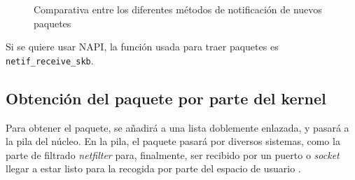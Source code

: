 \begin{figure}[hbtp]
\centering
{}%
\hspace{0.2\textwidth}
%
%
\caption{Comparativa entre los diferentes métodos de notificación de nuevos paquetes}
\end{figure}
%

Si se quiere usar NAPI, la función usada para traer paquetes es \texttt{netif\_receive\_skb}.

\subsection{Obtención del paquete por parte del kernel}
Para obtener el paquete, se añadirá a una lista doblemente enlazada, y pasará a la pila del núcleo. En la pila, el 
paquete pasará por diversos sistemas, como la parte de filtrado \emph{\gls{netfilter}} para, 
finalmente, ser recibido por un puerto o \emph{\gls{socket}} llegar a estar listo para la recogida por parte del espacio 
de usuario \cite{p206}.


